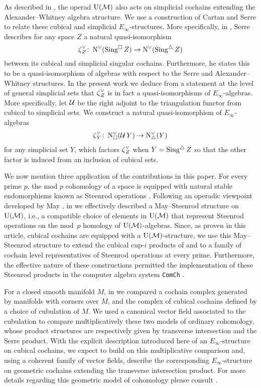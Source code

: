 As described in \cite{medina2020prop1}, the operad ${\operatorname{U}(\mathcal{M})}$ also acts on simplicial cochains extending the Alexander--Whitney algebra structure.
We use a construction of Cartan and Serre to relate these cubical and simplicial $E_\infty$-structures.
More specifically, in \cite[p. 442]{serre1951homologie}, Serre describes for any space $Z$ a natural quasi-isomorphism
\[
\operatorname{\zeta}_Z^\vee \colon \operatorname{N^{\vee}}(\operatorname{Sing^{\square}} Z) \to \operatorname{N^{\vee}}(\operatorname{Sing^{\triangle}} Z)
\]
between its cubical and simplicial singular cochains.
Furthermore, he states this to be a quasi-isomorphism of algebras with respect to the Serre and Alexander--Whitney structures.
In the present work we deduce from a statement at the level of general simplicial sets that $\operatorname{\zeta}_Z^\vee$ is in fact a quasi-isomorphisms of $E_\infty$-algebras.
More specifically, let $\operatorname{\mathcal{U}}$ be the right adjoint to the triangulation functor from cubical to simplicial sets.
We construct a natural quasi-isomorphism of $E_\infty$-algebras
\[
\operatorname{\zeta}_Y^\vee \colon \operatorname{N^{\vee}_{\square}}(\operatorname{\mathcal{U}} Y) \to \operatorname{N^{\vee}_{\triangle}}(Y)
\]
for any simplicial set $Y$, which factors $\operatorname{\zeta}_Z^\vee$ when $Y = \operatorname{Sing^{\triangle}} Z$ so that the other factor is induced from an inclusion of cubical sets.

We now mention three application of the contributions in this paper.
For every prime $p$, the mod $p$ cohomology of a space is equipped with natural stable endomorphisms known as Steenrod operations \cite{steenrod1962cohomology}.
Following an operadic viewpoint developed by May \cite{may1970general}, in \cite{medina2020maysteenrod} we effectively described a May--Steenrod structure on ${\operatorname{U}(\mathcal{M})}$, i.e., a compatible choice of elements in ${\operatorname{U}(\mathcal{M})}$ that represent Steenrod operations on the mod~$p$ homology of ${\operatorname{U}(\mathcal{M})}$-algebras.
Since, as proven in this article, cubical cochains are equipped with a ${\operatorname{U}(\mathcal{M})}$-structure, we use this May--Steenrod structure to extend the cubical cup-$i$ products of \cite{kadeishvili2003cupi} and \cite{pilarczyk2016cubical} to a family of cochain level representatives of Steenrod operations at every prime.
Furthermore, the effective nature of these constructions permitted the implementation of these Steenrod products in the computer algebra system \texttt{ComCh} \cite{medina2021computer}.

For a closed smooth manifold $M$, in \cite{medina2021flowing} we compared a cochain complex generated by manifolds with corners over $M$, and the complex of cubical cochains defined by a choice of cubulation of $M$.
We used a canonical vector field associated to the cubulation to compare multiplicatively these two models of ordinary cohomology, whose product structures are respectively given by transverse intersection and the Serre product.
With the explicit description introduced here of an $E_\infty$-structure on cubical cochains, we expect to build on this multiplicative comparison and, using a coherent family of vector fields, describe the corresponding $E_\infty$-structure on geometric cochains extending the transverse intersection product.
For more details regarding this geometric model of cohomology please consult \cite{medina2021foundations}.

